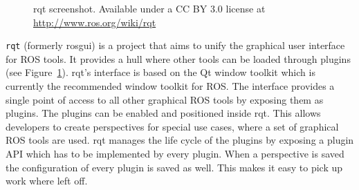 \begin{figure}[p]
  \centering
  \caption{rqt screenshot. Available under a CC BY 3.0 license at \url{http://www.ros.org/wiki/rqt}}
  \label{rqt_screenshot}
\end{figure}

\texttt{rqt} (formerly rosgui) is a project that aims to unify the graphical user interface for ROS tools. It provides a hull where other tools can be loaded through plugins (see Figure~\ref{rqt_screenshot}). rqt's interface is based on the Qt window toolkit which is currently the recommended window toolkit for ROS. The interface provides a single point of access to all other graphical ROS tools by exposing them as plugins. The plugins can be enabled and positioned inside rqt. This allows developers to create perspectives for special use cases, where a set of graphical ROS tools are used. rqt manages the life cycle of the plugins by exposing a plugin API which has to be implemented by every plugin. When a perspective is saved the configuration of every plugin is saved as well. This makes it easy to pick up work where left off.




